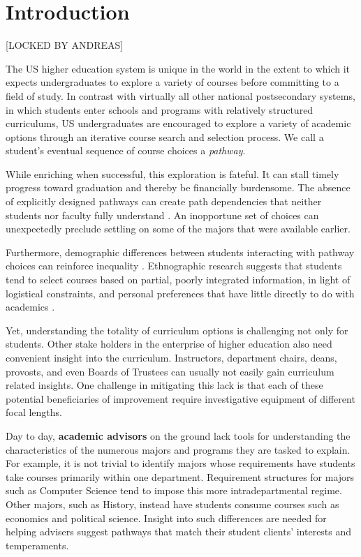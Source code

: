 \section{Introduction}
{\color{red}[LOCKED BY ANDREAS]}



The US higher education system is unique in the world in the extent to
which it expects undergraduates to explore a variety of courses before
committing to a field of study. In contrast with virtually all other
national postsecondary systems, in which students enter schools and
programs with relatively structured curriculums, US undergraduates are
encouraged to explore a variety of academic options through an
iterative course search and selection process. We call a student's
eventual sequence of course choices a {\it pathway}.

While enriching when successful, this exploration is fateful. It can
stall timely progress toward graduation \cite{bailey2015redesigning}
and thereby be financially burdensome. The absence of explicitly
designed pathways can create path dependencies that neither students
nor faculty fully understand \cite{chambliss2014college}. An
inopportune set of choices can unexpectedly preclude settling on some
of the majors that were available earlier. 

Furthermore, demographic differences between students interacting with
pathway choices can reinforce inequality
\cite{armstrong2013paying}. Ethnographic research suggests that
students tend to select courses based on partial, poorly integrated
information, in light of logistical constraints, and personal
preferences that have little directly to do with academics
\cite{nathan2006my,rosenbaum2011complexities, rosenbaum2007after}.

Yet, understanding the totality of curriculum options is challenging
not only for students. Other stake holders in the enterprise of higher
education also need convenient insight into the
curriculum. Instructors, department chairs, deans, provosts, and even
Boards of Trustees can usually not easily gain curriculum related
insights. One challenge in mitigating this lack is that each of these
potential beneficiaries of improvement require investigative equipment
of different focal lengths.

Day to day, {\bf academic advisors} on the ground lack tools for
understanding the characteristics of the numerous majors and programs
they are tasked to explain. For example, it is not trivial to identify
majors whose requirements have students take courses primarily within
one department. Requirement structures for majors such as Computer
Science tend to impose this more intradepartmental regime. Other
majors, such as History, instead have students consume courses such as
economics and political science. Insight into such differences are
needed for helping advisers suggest pathways that match their student
clients' interests and temperaments.

